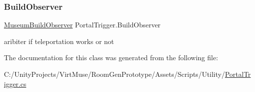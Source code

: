 \subsubsection{\texorpdfstring{Build\+Observer}{BuildObserver}}
{\footnotesize\ttfamily \mbox{\hyperlink{class_museum_build_observer}{Museum\+Build\+Observer}} Portal\+Trigger.\+Build\+Observer\hspace{0.3cm}{\ttfamily [private]}}



aribiter if teleportation works or not 



The documentation for this class was generated from the following file\+:\begin{DoxyCompactItemize}
\item 
C\+:/\+Unity\+Projects/\+Virt\+Muse/\+Room\+Gen\+Prototype/\+Assets/\+Scripts/\+Utility/\mbox{\hyperlink{_portal_trigger_8cs}{Portal\+Trigger.\+cs}}\end{DoxyCompactItemize}
